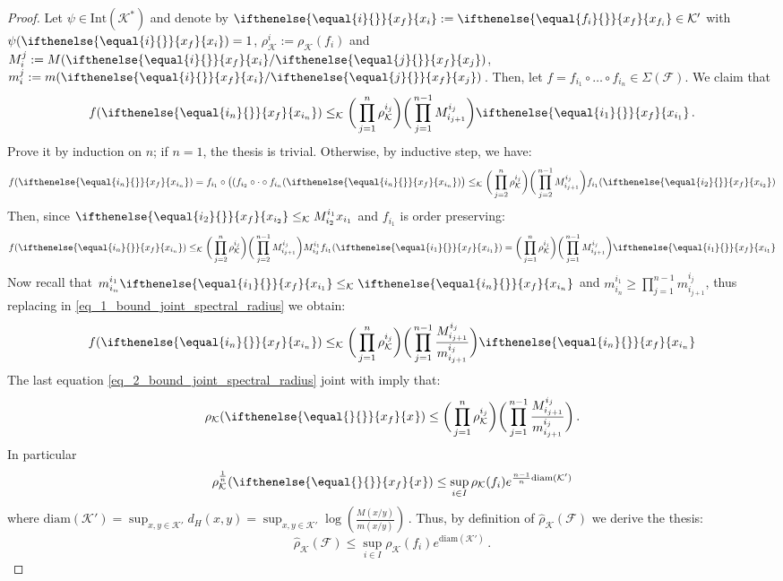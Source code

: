 \documentclass{article}
\newcommand{\family}{\mathcal{F}}
\newcommand{\cradius}{\rho_{\cone}}
\newcommand{\cgradius}{\widehat{\rho}_{\cone}}
\newcommand{\comp}{\circ}
\newcommand{\cone}{\mathcal{K}}
\newcommand{\interior}{\mathrm{Int}}
\newcommand{\dist}{d_H}
\newcommand{\cleq}{\leq_{\cone}}
\newcommand{\ceigenvector}[1][]{
  \ifthenelse{\equal{#1}{}}
  {{x_f}}
  {{x}_{#1}}}
\begin{document}
\begin{proof}
    Let $\psi\in\interior(\cone^*)$ and denote by $\ceigenvector[i]:=\ceigenvector[f_i]\in\cone'$ with $\psi(\ceigenvector[i])=1$, $\cradius^i:=\cradius(f_i)$ and $M_i^j:=M(\ceigenvector[i]/\ceigenvector[j])$, $m_i^j:=m(\ceigenvector[i]/\ceigenvector[j])$\,. Then, let $f=f_{i_1}\comp\dots\comp f_{i_n}\in \Sigma(\family)$. We claim that 
    \begin{equation}
        f(\ceigenvector[i_n])\cleq \bigg(\prod_{j=1}^n \cradius^{i_j}\bigg) \bigg(\prod_{j=1}^{n-1} M_{i_{j+1}}^{i_j}\bigg)\ceigenvector[i_1]\,. 
    \end{equation}
    Prove it by induction on $n$; if $n=1$, the thesis is trivial. Otherwise, by inductive step, we have:
    \begin{equation} f(\ceigenvector[i_n])=f_{i_1}\comp\big((f_{i_2}\comp\cdot\comp f_{i_n}(\ceigenvector[i_n])\big)\cleq \bigg(\prod_{j=2}^n \cradius^{i_j}\bigg) \bigg(\prod_{j=2}^{n-1} M_{i_{j+1}}^{i_j}\bigg) f_{i_1}(\ceigenvector[i_2])
    \end{equation}
    Then, since $\ceigenvector[i_2]\cleq M_{i_2}^{i_1}x_{i_1}$ and $f_{i_1}$ is order preserving:
\begin{equation}\label{eq_1_bound_joint_spectral_radius} f(\ceigenvector[i_n])\cleq \bigg(\prod_{j=2}^n \cradius^{i_j}\bigg) \bigg(\prod_{j=2}^{n-1} M_{i_{j+1}}^{i_j}\bigg) M_{i_2}^{i_1}
f_{i_1}(\ceigenvector[i_1])= \bigg(\prod_{j=1}^n \cradius^{i_j}\bigg) \bigg(\prod_{j=1}^{n-1} M_{i_{j+1}}^{i_j}\bigg) \ceigenvector[i_1]
\end{equation}
Now recall that $m_{i_n}^{i_1} \ceigenvector[i_1]\cleq \ceigenvector[i_n]$ and $m_{i_n}^{i_1}\geq \prod_{j=1}^{n-1} m_{i_{j+1}}^{i_j}$, thus replacing in \eqref{eq_1_bound_joint_spectral_radius} we obtain:
\begin{equation}\label{eq_2_bound_joint_spectral_radius} f(\ceigenvector[i_n])\cleq \bigg(\prod_{j=1}^n \cradius^{i_j}\bigg) \bigg(\prod_{j=1}^{n-1} \frac{M_{i_{j+1}}^{i_j}}{m_{i_{j+1}}^{i_j}}\bigg) \ceigenvector[i_n]
\end{equation}
The last equation \eqref{eq_2_bound_joint_spectral_radius} joint with  imply that:
\begin{equation}
    \cradius(\ceigenvector)\leq  \bigg(\prod_{j=1}^n \cradius^{i_j}\bigg) \bigg(\prod_{j=1}^{n-1} \frac{M_{i_{j+1}}^{i_j}}{m_{i_{j+1}}^{i_j}}\bigg)\,.
\end{equation}
In particular 
\begin{equation}
    \cradius^{\frac{1}{n}}(\ceigenvector)\leq \sup_{i\in I}\cradius(f_i)e^{\frac{n-1}{n}\mathrm{diam}(\cone')}
\end{equation}
where $\mathrm{diam}(\cone')=\sup_{x,y\in \cone'}\dist(x,y)=\sup_{x,y\in \cone'}\log(\frac{M(x/y)}{m(x/y)})$\,.
Thus, by definition of $\cgradius(\family)$ we derive the thesis:
\begin{equation}
    \cgradius(\family)\leq \sup_{i\in I}\cradius(f_i)e^{\mathrm{diam}(\cone')}\,.
\end{equation}
\end{proof}
\end{document}
